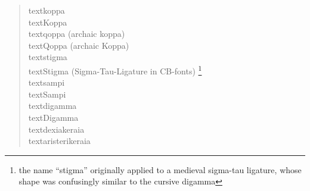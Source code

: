 \documentclass[a4paper]{article}
\begin{document}
\begin{quote}
\textkoppa{}      textkoppa                 \\ %
\textKoppa{}      textKoppa                 \\ %
\textqoppa{}      textqoppa (archaic koppa) \\ %
\textQoppa{}      textQoppa (archaic Koppa) \\ %
\textstigma{}     textstigma                \\ %
\textStigma{}     textStigma (Sigma-Tau-Ligature in CB-fonts)%
\footnote{the name ``stigma'' originally applied to a medieval sigma-tau
         ligature, whose shape was confusingly similar to the cursive
         digamma} \\ %
\textsampi{}      textsampi  \\ %
\textSampi{}      textSampi  \\ %
\textdigamma{}    textdigamma  \\ %
\textDigamma{}    textDigamma  \\ %
\textdexiakeraia{}    textdexiakeraia  \\ %
\textaristerikeraia{} textaristerikeraia \\ %
\end{quote}
\end{document}
